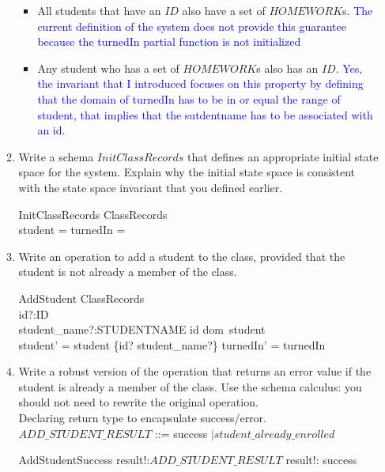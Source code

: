 \documentclass{article}
\begin{document}
\begin{enumerate}
\begin{enumerate}
\begin{itemize}
\item All students that have an $ID$ also have a set of
  $HOMEWORK$s.
  \textcolor{blue}{The current definition of the system does not provide this guarantee because the turnedIn partial function is not initialized}

\item Any student who has a set of $HOMEWORK$s also has an $ID$.
 \textcolor{blue}{Yes, the invariant that I introduced focuses on this property by defining that the domain of turnedIn has to be in or equal the range of student, that implies that the sutdentname has to be associated with an id.}
\end{itemize}


\item Write a schema $InitClassRecords$ that defines an
appropriate initial state space for the system. Explain why the
initial state space is consistent with the state space invariant
that you defined earlier.
\color{blue}
\begin{schema}{InitClassRecords}
  ClassRecords \\
  student = turnedIn = \emptyset 
\where
\color{blue}
\end{schema}
\color{black}
\item Write an operation to add a student to the class, provided
that the student is not already a member of the class.
\color{blue}
\begin{schema}{AddStudent}
  \Delta ClassRecords \\
  id?:ID \\
  student\_name?:STUDENTNAME
\where
id \notin dom\, student \\
student' = student \union \{id? \mapsto student\_name?\} \land turnedIn' = turnedIn
\end{schema}
\color{black}

\item Write a robust version of the operation that returns an error
value if the student is already a member of the class. Use the schema
calculus: you should not need to rewrite the original operation.
\color{blue}\\
Declaring return type to encapsulate success/error. \\
$ADD\_STUDENT\_RESULT$ ::= success $\mid student\_already\_enrolled$ \\
\begin{schema}{AddStudentSuccess}
    result!:$ADD\_STUDENT\_RESULT$
  \where
    result!: success
\end{schema}


\end{enumerate}
\end{enumerate}
\end{document}
